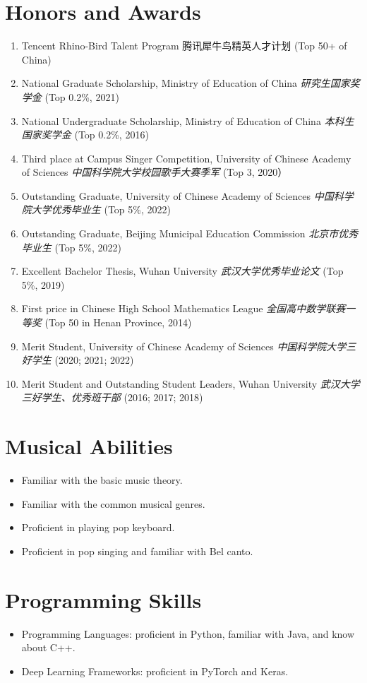\documentclass{resume}
\begin{document}
\section{Honors and Awards}
\begin{enumerate}
  \item Tencent Rhino-Bird Talent Program 腾讯犀牛鸟精英人才计划 (Top 50+ of China)
  \item National Graduate Scholarship, Ministry of Education of China \textit{研究生国家奖学金} (Top 0.2\%, 2021)
  \item National Undergraduate Scholarship, Ministry of Education of China \textit{本科生国家奖学金} (Top 0.2\%, 2016)
  \item Third place at Campus Singer Competition, University of Chinese Academy of Sciences \textit{中国科学院大学校园歌手大赛季军} (Top 3, 2020）
  \item Outstanding Graduate, University of Chinese Academy of Sciences \textit{中国科学院大学优秀毕业生} (Top 5\%, 2022)
  \item Outstanding Graduate, Beijing Municipal Education Commission \textit{北京市优秀毕业生} (Top 5\%, 2022)
  \item Excellent Bachelor Thesis, Wuhan University \textit{武汉大学优秀毕业论文} (Top 5\%, 2019)
  \item First price in Chinese High School Mathematics League \textit{全国高中数学联赛一等奖} (Top 50 in Henan Province, 2014)
  \item Merit Student, University of Chinese Academy of Sciences \textit{中国科学院大学三好学生} (2020; 2021; 2022)
  \item Merit Student and Outstanding Student Leaders, Wuhan University \textit{武汉大学三好学生、优秀班干部} (2016; 2017; 2018)
\end{enumerate}

\section{Musical Abilities}
\begin{itemize}
  \item Familiar with the basic music theory.
  \item Familiar with the common musical genres.
  \item Proficient in playing pop keyboard.
  \item Proficient in pop singing and familiar with Bel canto.
\end{itemize}

\section{Programming Skills}
\begin{itemize}
  \item Programming Languages: proficient in Python, familiar with Java, and know about C++.
  \item Deep Learning Frameworks: proficient in PyTorch and Keras.
\end{itemize}
\end{document}
